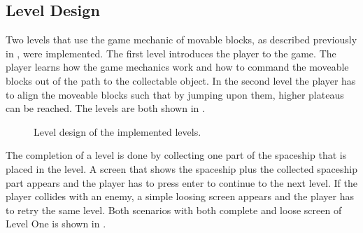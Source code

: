 \subsection{Level Design}\label{sec:game_design_level}
Two levels that use the game mechanic of movable blocks, as described previously in , were implemented.
The first level introduces the player to the game.
The player learns how the game mechanics work and how to command the moveable blocks out of the path to the collectable object.
In the second level the player has to align the moveable blocks such that by jumping upon them, higher plateaus can be reached.
The levels are both shown in .
\begin{figure}[!ht]
  \centering
  \qquad
  \caption{Level design of the implemented levels.}
  \label{fig:game_design_level}
\end{figure}
\FloatBarrier
\noindent
The completion of a level is done by collecting one part of the spaceship that is placed in the level.
A screen that shows the spaceship plus the collected spaceship part appears and the player has to press enter to continue to the next level.
If the player collides with an enemy, a simple loosing screen appears and the player has to retry the same level.
Both scenarios with both complete and loose screen of Level One is shown in .

